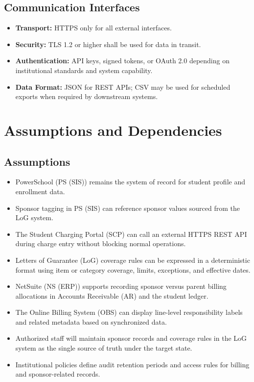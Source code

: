 \documentclass[12pt,a4paper]{article}
\begin{document}
\subsection{Communication Interfaces}

\begin{itemize}
  \item \textbf{Transport:} HTTPS only for all external interfaces.
  \item \textbf{Security:} TLS 1.2 or higher shall be used for data in transit.
  \item \textbf{Authentication:} API keys, signed tokens, or OAuth 2.0 depending on institutional standards and system capability.
  \item \textbf{Data Format:} JSON for REST APIs; CSV may be used for scheduled exports when required by downstream systems.
\end{itemize}

\section{Assumptions and Dependencies}

\subsection{Assumptions}
\begin{itemize}
  \item PowerSchool (PS (SIS)) remains the system of record for student profile and enrollment data.
  \item Sponsor tagging in PS (SIS) can reference sponsor values sourced from the LoG system.
  \item The Student Charging Portal (SCP) can call an external HTTPS REST API during charge entry without blocking normal operations.
  \item Letters of Guarantee (LoG) coverage rules can be expressed in a deterministic format using item or category coverage, limits, exceptions, and effective dates.
  \item NetSuite (NS (ERP)) supports recording sponsor versus parent billing allocations in Accounts Receivable (AR) and the student ledger.
  \item The Online Billing System (OBS) can display line-level responsibility labels and related metadata based on synchronized data.
  \item Authorized staff will maintain sponsor records and coverage rules in the LoG system as the single source of truth under the target state.
  \item Institutional policies define audit retention periods and access rules for billing and sponsor-related records.
\end{itemize}
\end{document}
